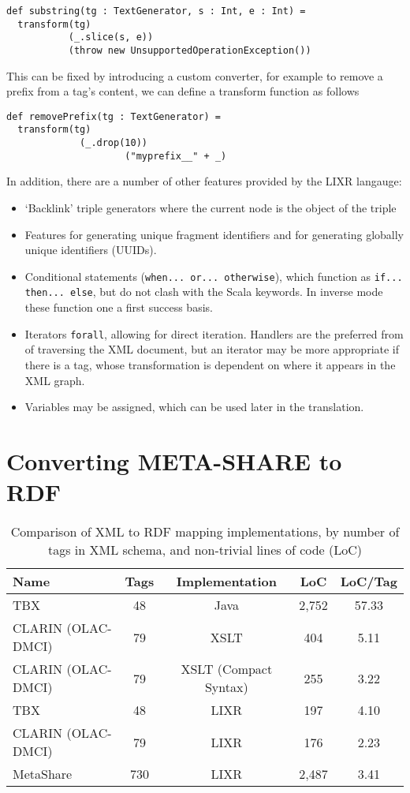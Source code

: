 \documentclass{acm_proc_article-sp}
\begin{document}
\begin{verbatim}
def substring(tg : TextGenerator, s : Int, e : Int) =
  transform(tg)
           (_.slice(s, e))
           (throw new UnsupportedOperationException())
\end{verbatim}

This can be fixed by introducing a custom converter, for example to remove a 
prefix from a tag's content, we can define a transform function as follows

\begin{verbatim}
def removePrefix(tg : TextGenerator) =
  transform(tg)
	         (_.drop(10))
					 ("myprefix__" + _) 
\end{verbatim}

In addition, there are a number of other features provided by the LIXR langauge:

\begin{itemize}
\item `Backlink' triple generators where the current node is the object of the triple
\item Features for generating unique fragment identifiers and for generating globally unique 
identifiers (UUIDs).
\item Conditional statements ({\tt when... or... otherwise}), which function as
{\tt if... then... else}, but do not clash with the Scala keywords. In inverse mode
these function one a first success basis.
\item Iterators {\tt forall}, allowing for direct iteration. Handlers are the 
preferred from of traversing the XML document, but an iterator may be more appropriate 
if there is a tag, whose transformation is dependent on where it appears in the
XML graph.
\item Variables may be assigned, which can be used later in the translation.
\end{itemize}

\section{Converting META-SHARE to RDF}
\label{sec:metashare}
\begin{table*}
\begin{center}
\begin{tabular}{p{4cm}|cccc}
Name & Tags & Implementation & LoC & LoC/Tag \\
\hline
TBX & 48 & Java & 2,752 & 57.33 \\
CLARIN (OLAC-DMCI) & 79 & XSLT & 404 & 5.11 \\
CLARIN (OLAC-DMCI) & 79 & XSLT (Compact Syntax) & 255 & 3.22 \\
\hline
TBX & 48 & LIXR & 197 & 4.10 \\
CLARIN (OLAC-DMCI) & 79 & LIXR & 176 & 2.23 \\
MetaShare & 730 & LIXR & 2,487 & 3.41 \\
\end{tabular}
\end{center}
\caption{\label{tab:locs}Comparison of XML to RDF mapping implementations,
by number of tags in XML schema, and non-trivial lines of code (LoC)}
\end{table*}
\end{document}

